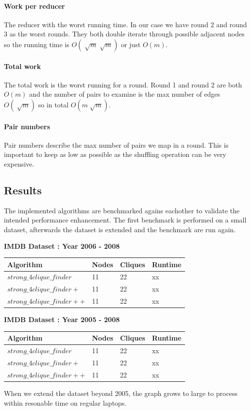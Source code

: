 \documentclass{article}
\begin{document}
\paragraph{Work per reducer}
The reducer with the worst running time. In our case we have round 2 and round 3 as the worst rounds. They both double iterate through possible adjacent nodes so the running time is $O(\sqrt[]{m}\sqrt[]{m})$ or just $O(m)$.

\paragraph{Total work}
The total work is the worst running for a round. Round 1 and round 2 are both $O(m)$ and the number of pairs to examine is the max number of edges $O(\sqrt[]{m})$ so in total $O(m\sqrt[]{m})$.

\paragraph{Pair numbers}
Pair numbers describe the max number of pairs we map in a round. This is important to keep as low as possible as the shuffling operation can be very expensive.

\subsection{Results}

The implemented algorithms are benchmarked agains eachother to validate the intended performance enhancement. The first benchmark is performed on a small dataset, afterwards the dataset is extended and the benchmark are run again.\newline

\textbf{IMDB Dataset : Year 2006 - 2008}
\begin{center}
    \begin{tabular}{ | l | l | l | l |}
    \hline
    Algorithm & Nodes & Cliques & Runtime \\ \hline
    $strong\_4clique\_finder$ & 11 & 22 & xx \\ \hline
    $strong\_4clique\_finder+$ & 11 & 22 & xx \\ \hline
    $strong\_4clique\_finder++$ & 11 & 22 & xx \\ \hline
    \end{tabular}
\end{center}

\textbf{IMDB Dataset : Year 2005 - 2008}
\begin{center}
    \begin{tabular}{ | l | l | l | l |}
    \hline
    Algorithm & Nodes & Cliques & Runtime \\ \hline
    $strong\_4clique\_finder$ & 11 & 22 & xx \\ \hline
    $strong\_4clique\_finder+$ & 11 & 22 & xx \\ \hline
    $strong\_4clique\_finder++$ & 11 & 22 & xx \\ \hline
    \end{tabular}
\end{center}
When we extend the dataset beyond 2005, the graph grows to large to process within resonable time on regular laptops.
\end{document}
